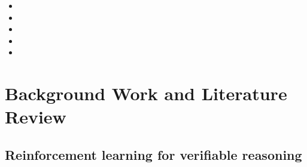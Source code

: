 \documentclass[conference]{IEEEtran}
\newif\ifdraft
\newcommand{\writehere}[2]{%
  \ifdraft
    {\color{orange!75!black}\small\textbf{[WRITE: #1]}\itshape\ #2\par}
    \medskip
  \fi}
\begin{document}
\begin{itemize}

\item \writehere{Contribution 1, the diagnosis}{
Correct count equals finished count per problem. 95 of 120 samples finished and
essentially all were correct; of the 25 truncated, 23 scored zero for want of a
parseable answer. The whole 91.4 to 80.8 shortfall is a truncation artifact.}

\item \writehere{Contribution 2, the intervention}{
Budget forcing \cite{s1} measured on a compact model at four budgets, significant
at every budget by McNemar's test, and strictly non destructive: zero correct
answers destroyed across 139 interventions.}

\item \writehere{Contribution 3, a negative result}{
Three forcing phrasings are statistically indistinguishable, and the two stage
variant costs 2.1 times more compute for no gain. What matters is that the model
is made to commit, not how it is asked.}

\item \writehere{Contribution 4, upper bounds}{
A single forced sample beats the best of four unforced samples at the smaller
budgets, so forcing exceeds the ceiling of any method that only selects among
existing answers. On the recoverable population it captures about 80 percent.}

\item \writehere{Contribution 5, the method that made it affordable}{
Prefix consistency. Generation is autoregressive, so the first N tokens of a long
run are what a budget N run would have produced. Generate once at the top budget,
score every smaller budget on CPU at no GPU cost. Validated, not assumed.}

\end{itemize}

\writehere{Roadmap, 2 or 3 sentences}{
One sentence per section, from Section II to Section VII.}

\section{Background Work and Literature Review}

\subsection{Reinforcement learning for verifiable reasoning}
\end{document}
